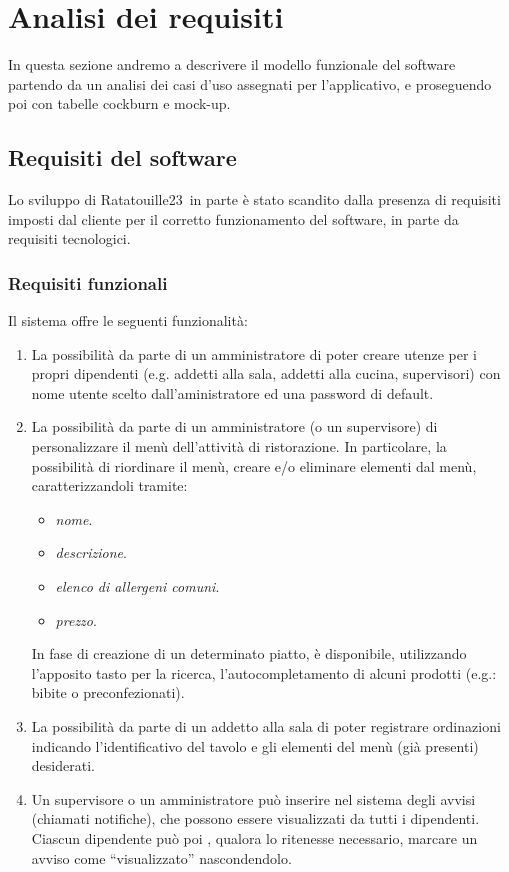 \section{Analisi dei requisiti}
In questa sezione andremo a descrivere il modello funzionale del software
partendo da un analisi dei casi d'uso assegnati per l'applicativo, e proseguendo poi con tabelle cockburn e mock-up.
\subsection{Requisiti del software}
Lo sviluppo di Ratatouille23\texttrademark\ in parte è stato scandito dalla presenza di requisiti imposti dal cliente per il corretto funzionamento del software, in parte da requisiti tecnologici.

\subsubsection{Requisiti funzionali}
Il sistema offre le seguenti funzionalità:
\begin{enumerate}
  \item La possibilità da parte di un amministratore di poter creare utenze per i propri dipendenti (e.g. addetti alla sala, addetti alla cucina, supervisori) con nome utente scelto dall'aministratore ed una password di default.

  \item La possibilità da parte di un amministratore (o un supervisore) di personalizzare il menù dell'attività di ristorazione. In particolare, la possibilità di riordinare il menù, creare e/o eliminare elementi dal menù, caratterizzandoli tramite:
        \begin{itemize}
          \item \textit{nome}.
          \item \textit{descrizione}.
          \item \textit{elenco di allergeni comuni}.
          \item \textit{prezzo}.
        \end{itemize}
        In fase di creazione di un determinato piatto, è disponibile, utilizzando l'apposito tasto per la ricerca, l'autocompletamento di alcuni prodotti (e.g.: bibite o preconfezionati).
  \item La possibilità da parte di un addetto alla sala di poter registrare ordinazioni indicando l'identificativo del tavolo e gli elementi del menù (già presenti) desiderati.
  \item Un supervisore o un amministratore può inserire nel sistema degli avvisi (chiamati notifiche), che possono essere
        visualizzati da tutti i dipendenti. Ciascun dipendente può poi , qualora lo ritenesse necessario, marcare un avviso come “visualizzato” nascondendolo.
\end{enumerate}

